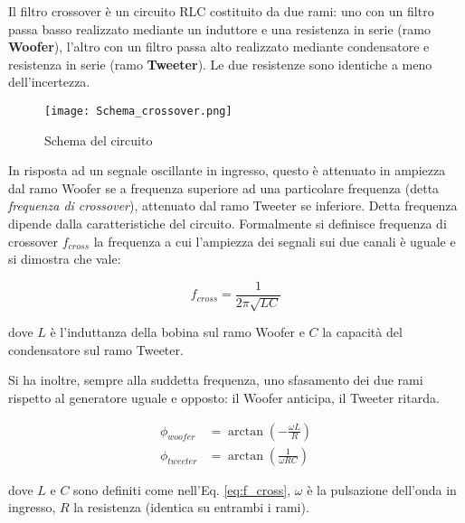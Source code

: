 \documentclass[../Relazione_circuiti]{subfiles}
\begin{document}
Il filtro crossover è un circuito RLC costituito da due rami: uno con un filtro passa basso realizzato mediante un
induttore e una resistenza in serie (ramo \textbf{Woofer}), l'altro con un filtro passa alto realizzato mediante
condensatore e resistenza in serie (ramo \textbf{Tweeter}). Le due resistenze sono identiche a meno dell'incertezza.

\begin{figure}[H]
  \centering
  \texttt{[image: Schema\_crossover.png]}

  \caption{Schema del circuito}
  \label{fig:schema_circuito}

\end{figure}

In risposta ad un segnale oscillante in ingresso, questo è attenuato in ampiezza dal ramo Woofer se a frequenza superiore ad una particolare frequenza (detta \textit{frequenza di crossover}),
attenuato dal ramo Tweeter se inferiore. 
Detta frequenza dipende dalla caratteristiche del circuito. Formalmente si definisce frequenza di crossover $f_{cross}$ la
frequenza a cui l'ampiezza dei segnali sui due canali è uguale e si dimostra che vale:

\begin{equation}
  \label{eq:f_cross}
  f_{cross} = \frac{1}{2 \pi \sqrt{LC} }
\end{equation}

dove $L$ è l'induttanza della bobina sul ramo Woofer e $C$ la capacità del condensatore sul ramo Tweeter.

Si ha inoltre, sempre alla suddetta frequenza, uno sfasamento dei due rami rispetto al generatore uguale e opposto: il
Woofer anticipa, il Tweeter ritarda.

\begin{align}
  \phi_{woofer} &= \arctan(-\frac{\omega L}{R}) \label{eq:p_woofer} \\
  \phi_{tweeter} &= \arctan(\frac{1}{\omega RC}) \label{eq:p_tweeter}
\end{align}


dove $L$ e $C$ sono definiti come nell'Eq. \eqref{eq:f_cross}, $\omega$ è la pulsazione dell'onda in ingresso, $R$ la resistenza
(identica su entrambi i rami).
\end{document}
